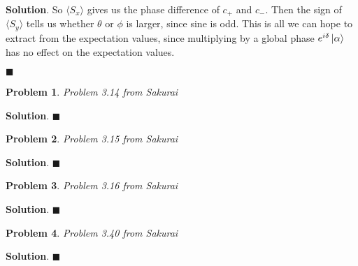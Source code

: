 \documentclass[12pt]{article}
\newtheorem{p}{Problem}
\theoremstyle{definition}
\newenvironment{s}{%
        \begin{trivlist} \item \textbf{Solution}. }{%
            \hspace*{\fill} $\blacksquare$\end{trivlist}}%
\begin{document}
{\begin{s}
So $\langle S_{x}\rangle$ gives us the phase difference of $c_{+}$ and $c_{-}$. Then the sign of $\langle S_{y} \rangle$ tells us whether $\theta$ or $\phi$ is larger, since sine is odd. This is all we can hope to extract from the expectation values, since multiplying by a global phase $e^{i\delta}\ket{\alpha}$ has no effect on the expectation values.


\end{s}

\begin{p}
Problem 3.14 from Sakurai
\end{p}

\begin{s}
\end{s}

\begin{p}
Problem 3.15 from Sakurai
\end{p}

\begin{s}
\end{s}

\begin{p}
Problem 3.16 from Sakurai
\end{p}

\begin{s}
\end{s}

\begin{p}
Problem 3.40 from Sakurai
\end{p}

\begin{s}
\end{s}
\end{document}
